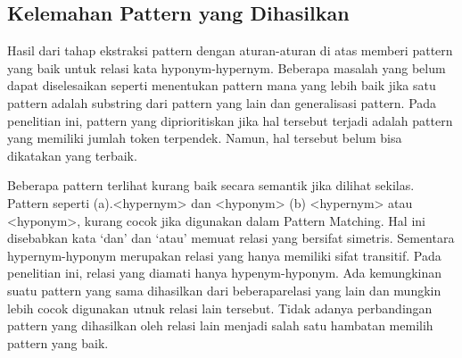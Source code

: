 \subsection{Kelemahan Pattern yang Dihasilkan}
Hasil dari tahap ekstraksi pattern dengan aturan-aturan di atas memberi pattern yang baik untuk relasi kata hyponym-hypernym. Beberapa masalah yang belum dapat diselesaikan seperti menentukan pattern mana yang lebih baik jika satu pattern adalah substring dari pattern yang lain dan generalisasi pattern. Pada penelitian ini, pattern yang diprioritiskan jika hal tersebut terjadi adalah pattern yang memiliki jumlah token terpendek. Namun, hal tersebut belum bisa dikatakan yang terbaik.

Beberapa pattern terlihat kurang baik secara semantik jika dilihat sekilas. Pattern seperti (a).<hypernym> dan <hyponym> (b) <hypernym> atau <hyponym>, kurang cocok jika digunakan dalam Pattern Matching. Hal ini disebabkan kata ‘dan’ dan ‘atau’ memuat relasi yang bersifat simetris. Sementara hypernym-hyponym merupakan relasi yang hanya memiliki sifat transitif. Pada penelitian ini, relasi yang  diamati hanya hypenym-hyponym. Ada kemungkinan suatu pattern yang sama dihasilkan dari beberaparelasi yang lain dan mungkin lebih cocok digunakan utnuk relasi lain tersebut. Tidak adanya perbandingan pattern yang dihasilkan oleh relasi lain menjadi salah satu hambatan memilih pattern yang baik.
